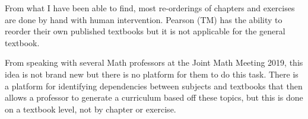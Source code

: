 From what I have been able to find, most re-orderings of chapters and exercises are done by hand with human intervention. Pearson (TM) has the ability to reorder their own published textbooks but it is not applicable for the general textbook.

From speaking with several Math professors at the Joint Math Meeting 2019, this idea is not brand new but there is no platform for them to do this task. There is a platform for identifying dependencies between subjects and textbooks that then allows a professor to generate a curriculum based off these topics, but this is done on a textbook level, not by chapter or exercise.





